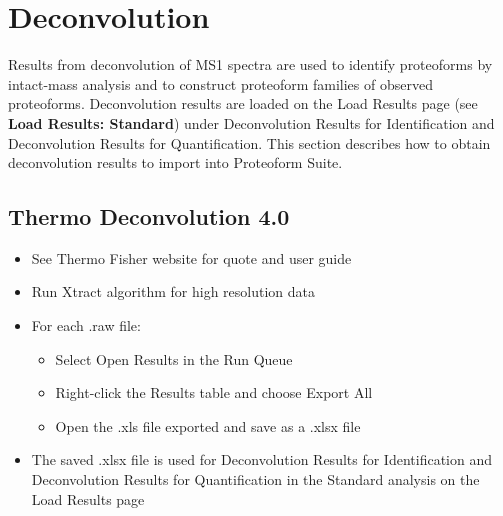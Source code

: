 
\section{Deconvolution}

Results from deconvolution of MS1 spectra are used to identify proteoforms by intact-mass analysis and to construct proteoform families of observed proteoforms. Deconvolution results are loaded on the Load Results page (see \textbf{Load Results: Standard}) under Deconvolution Results for Identification and Deconvolution Results for Quantification. This section describes how to obtain deconvolution results to import into Proteoform Suite.

\subsection{Thermo Deconvolution 4.0}
\begin{itemize}
\item See Thermo Fisher website for quote and user guide
\item Run Xtract algorithm for high resolution data
\item For each .raw file:
\begin{itemize}
	\item Select Open Results in the Run Queue
	\item Right-click the Results table and choose Export All
	\item Open the .xls file exported and save as a .xlsx file
\end{itemize}
\item The saved .xlsx file is used for Deconvolution Results for Identification and Deconvolution Results for Quantification in the Standard analysis on the Load Results page
\end{itemize}

